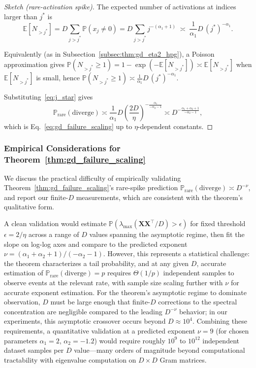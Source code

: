 \documentclass[11pt]{article}
\theoremstyle{plain}
\theoremstyle{definition}
\theoremstyle{remark}
\newcommand{\JSCheck}[1]{#1}
\begin{document}
\begin{proof}[Sketch (rare-activation spike)]
The expected number of activations at indices larger than $j^\ast$ is
\[
\mathbb{E}[N_{>j^\ast}]
=
D\sum_{j>j^\ast}\mathbb{P}(x_j\neq 0)
=
D\sum_{j>j^\ast} j^{-(\alpha_1+1)}
\;\asymp\;
\frac{1}{\alpha_1}D\,(j^\ast)^{-\alpha_1}.
\]

Equivalently (as in Subsection~\ref{subsec:thm:gd_eta2_hpg}), a Poisson approximation gives
$\mathbb{P}(N_{>j^\ast}\ge 1)=1-\exp(-\mathbb{E}[N_{>j^\ast}])\asymp \mathbb{E}[N_{>j^\ast}]$ when
$\mathbb{E}[N_{>j^\ast}]$ is small, hence
$\mathbb{P}(N_{>j^\ast}\ge 1)\asymp \frac{1}{\alpha_1}D\,(j^\ast)^{-\alpha_1}$.


Substituting~\eqref{eq:j_star} gives
\[
\mathbb{P}_{\mathrm{rare}}(\mathrm{diverge}) \asymp
\frac{1}{\alpha_1}D
\left(\frac{2D}{\eta}\right)^{-\frac{\alpha_1}{-\alpha_2-1}}
\asymp D^{-\frac{\alpha_1+\alpha_2+1}{-\alpha_2-1}},
\]
which is Eq.~\eqref{eq:gd_failure_scaling} up to $\eta$-dependent constants.
\end{proof}

\subsubsection{Empirical Considerations for Theorem~\ref{thm:gd_failure_scaling}}
\label{app:gd_failure_empirical}
We discuss the practical difficulty of empirically validating Theorem~\ref{thm:gd_failure_scaling}'s rare-spike prediction $\mathbb{P}_{\mathrm{rare}}(\mathrm{diverge})\asymp D^{-\nu}$, and report our finite-$D$ measurements, which are consistent with the theorem's qualitative form.

\JSCheck{A clean validation would estimate $\mathbb{P}\!\left(\lambda_{\max}(\mathbf{X}\mathbf{X}^\top/D) > \epsilon\right)$ for fixed threshold $\epsilon = 2/\eta$ across a range of $D$ values spanning the asymptotic regime, then fit the slope on log-log axes and compare to the predicted exponent $\nu = (\alpha_1+\alpha_2+1)/(-\alpha_2-1)$. However, this represents a statistical challenge: the theorem characterizes a tail probability, and at any given $D$, accurate estimation of $\mathbb{P}_{\mathrm{rare}}(\mathrm{diverge})=p$ requires $\Theta(1/p)$ independent samples to observe events at the relevant rate, with sample size scaling further with $\nu$ for accurate exponent estimation. For the theorem's asymptotic regime to dominate observation, $D$ must be large enough that finite-$D$ corrections to the spectral concentration are negligible compared to the leading $D^{-\nu}$ behavior; in our experiments, this asymptotic crossover occurs beyond $D \approx 10^4$. Combining these requirements, a quantitative validation at a predicted exponent $\nu = 9$ (for chosen parameters $\alpha_1 = 2$, $\alpha_2 = -1.2$) would require roughly $10^9$ to $10^{12}$ independent dataset samples per $D$ value---many orders of magnitude beyond computational tractability with eigenvalue computation on $D \times D$ Gram matrices.}
\end{document}
